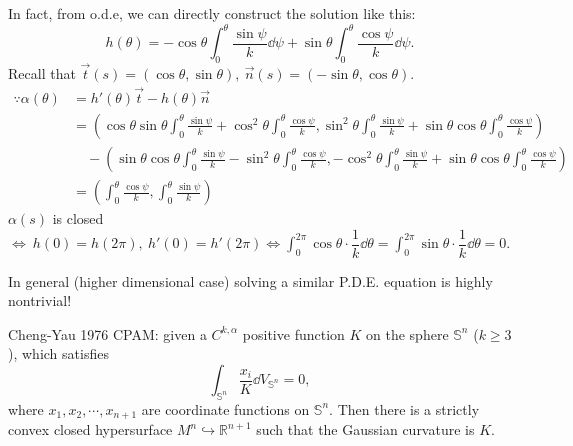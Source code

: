 In fact, from o.d.e, we can directly construct the solution like this:
\[
    h(\theta)=-\cos\theta \int_0^\theta \frac{\sin \psi}{k}\dd \psi
    +\sin\theta \int_0^\theta \frac{\cos \psi}{k}\dd \psi  
.\]
Recall that $\vec{t}(s)=(\cos\theta,\sin\theta),~\vec{n}(s)=(-\sin \theta,\cos\theta).$
\begin{align*}
    \because \alpha(\theta)&=h'(\theta)\vec{t}-h(\theta)\vec{n}\\
    &=\left(
        \cos\theta\sin\theta\int_0^\theta\frac{\sin\psi}{k}
        +\cos^2\theta\int_0^\theta\frac{\cos\psi}{k},
        \sin^2\theta\int_0^\theta\frac{\sin\psi}{k}
        +\sin\theta\cos\theta\int_0^\theta\frac{\cos\psi}{k}
    \right)\\
    &\quad-\left( 
        \sin\theta\cos\theta\int_0^\theta\frac{\sin\psi}{k}
        -\sin^2\theta\int_0^\theta\frac{\cos\psi}{k},
        -\cos^2\theta\int_0^\theta\frac{\sin\psi}{k}
        +\sin\theta\cos\theta\int_0^\theta\frac{\cos\psi}{k}
    \right)\\
    &=\left(
        \int_0^\theta\frac{\cos\psi}{k},
        \int_0^\theta\frac{\sin\psi}{k}
    \right)
\end{align*}
$\alpha(s)$ is closed $\Leftrightarrow~h(0)=h(2\pi),~h'(0)=h'(2\pi)
\Leftrightarrow \int_0^{2\pi}\cos\theta\cdot\dfrac{1}{k}\dd \theta
=\int_0^{2\pi}\sin\theta\cdot\dfrac{1}{k}\dd \theta
=0$.
\begin{remark}
    In general (higher dimensional case) solving a similar P.D.E. equation is highly nontrivial!
    
    Cheng-Yau 1976 CPAM: given a $C^{k,\alpha}$ positive function $K$ on the
    sphere $\mathbb{S}^n$ ($k\ge 3$), which satisfies
    \[
    \int_{\mathbb{S}^n}\frac{x_i}{K}\dd V_{\mathbb{S}^n}=0
    ,\]
    where $x_1,x_2,\cdots,x_{n+1}$ are coordinate functions on 
    $\mathbb{S}^n$. 
    Then there is a strictly convex closed 
    hypersurface $M^n \hookrightarrow \mathbb{R}^{n+1}$ such
    that the Gaussian curvature is $K$.
\end{remark} 
